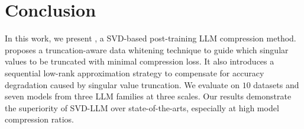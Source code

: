 \vspace{-2mm}
\section{Conclusion}
\vspace{-2mm}
\label{sec:conclusion}
In this work, we present \sysname, a SVD-based
post-training LLM compression method. 
%
\sysname proposes a truncation-aware data whitening technique to guide which singular values to be truncated with minimal compression loss. It also introduces a sequential low-rank approximation strategy to compensate for accuracy degradation caused by singular value truncation.
%
We evaluate \sysname on $10$ datasets and seven models from three LLM families at three scales. Our results demonstrate
 the superiority of SVD-LLM over state-of-the-arts, especially at high model compression ratios.